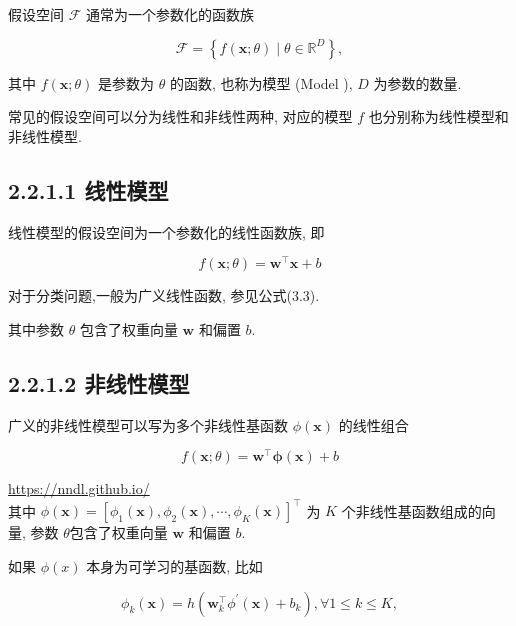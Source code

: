 \documentclass[10pt]{article}
\begin{document}
假设空间 $\mathcal{F}$ 通常为一个参数化的函数族


\begin{equation*}
\mathcal{F}=\left\{f(\boldsymbol{x} ; \theta) \mid \theta \in \mathbb{R}^{D}\right\}, \tag{2.5}
\end{equation*}


其中 $f(\boldsymbol{x} ; \theta)$ 是参数为 $\theta$ 的函数, 也称为模型 (Model ), $D$ 为参数的数量.

常见的假设空间可以分为线性和非线性两种, 对应的模型 $f$ 也分别称为线性模型和非线性模型.

\subsection*{2.2.1.1 线性模型}
线性模型的假设空间为一个参数化的线性函数族, 即


\begin{equation*}
f(\boldsymbol{x} ; \theta)=\boldsymbol{w}^{\top} \boldsymbol{x}+b \tag{2.6}
\end{equation*}


对于分类问题,一般为广义线性函数, 参见公式(3.3).

其中参数 $\theta$ 包含了权重向量 $\boldsymbol{w}$ 和偏置 $b$.

\subsection*{2.2.1.2 非线性模型}
广义的非线性模型可以写为多个非线性基函数 $\phi(\boldsymbol{x})$ 的线性组合


\begin{equation*}
f(\boldsymbol{x} ; \theta)=\boldsymbol{w}^{\top} \boldsymbol{\phi}(\boldsymbol{x})+b \tag{2.7}
\end{equation*}


\href{https://nndl.github.io/}{https://nndl.github.io/}\\
其中 $\phi(\boldsymbol{x})=\left[\phi_{1}(\boldsymbol{x}), \phi_{2}(\boldsymbol{x}), \cdots, \phi_{K}(\boldsymbol{x})\right]^{\top}$ 为 $K$ 个非线性基函数组成的向量, 参数 $\theta$包含了权重向量 $\boldsymbol{w}$ 和偏置 $b$.

如果 $\phi(x)$ 本身为可学习的基函数, 比如


\begin{equation*}
\phi_{k}(\boldsymbol{x})=h\left(\boldsymbol{w}_{k}^{\top} \phi^{\prime}(\boldsymbol{x})+b_{k}\right), \forall 1 \leq k \leq K, \tag{2.8}
\end{equation*}
\end{document}
